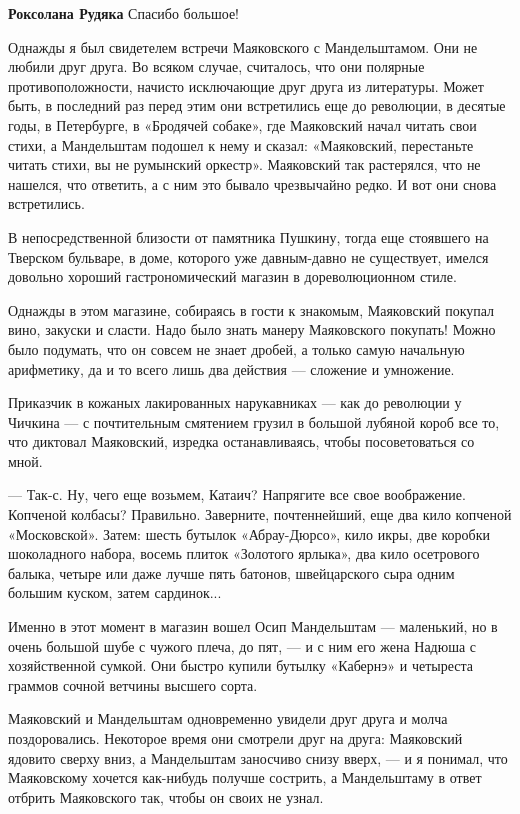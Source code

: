 \begin{itemize}
\textbf{Роксолана Рудяка} Спасибо большое!


Однажды я был свидетелем встречи Маяковского с Мандельштамом. Они не любили
друг друга. Во всяком случае, считалось, что они полярные противоположности,
начисто исключающие друг друга из литературы. Может быть, в последний раз перед
этим они встретились еще до революции, в десятые годы, в Петербурге, в
«Бродячей собаке», где Маяковский начал читать свои стихи, а Мандельштам
подошел к нему и сказал: «Маяковский, перестаньте читать стихи, вы не румынский
оркестр». Маяковский так растерялся, что не нашелся, что ответить, а с ним это
бывало чрезвычайно редко. И вот они снова встретились.

В непосредственной близости от памятника Пушкину, тогда еще стоявшего на
Тверском бульваре, в доме, которого уже давным-давно не существует, имелся
довольно хороший гастрономический магазин в дореволюционном стиле.

Однажды в этом магазине, собираясь в гости к знакомым, Маяковский покупал вино,
закуски и сласти. Надо было знать манеру Маяковского покупать! Можно было
подумать, что он совсем не знает дробей, а только самую начальную арифметику,
да и то всего лишь два действия — сложение и умножение.

Приказчик в кожаных лакированных нарукавниках — как до революции у Чичкина — с
почтительным смятением грузил в большой лубяной короб все то, что диктовал
Маяковский, изредка останавливаясь, чтобы посоветоваться со мной.

— Так-с. Ну, чего еще возьмем, Катаич? Напрягите все свое воображение. Копченой
колбасы? Правильно. Заверните, почтеннейший, еще два кило копченой
«Московской». Затем: шесть бутылок «Абрау-Дюрсо», кило икры, две коробки
шоколадного набора, восемь плиток «Золотого ярлыка», два кило осетрового
балыка, четыре или даже лучше пять батонов, швейцарского сыра одним большим
куском, затем сардинок...

Именно в этот момент в магазин вошел Осип Мандельштам — маленький, но в очень
большой шубе с чужого плеча, до пят, — и с ним его жена Надюша с хозяйственной
сумкой. Они быстро купили бутылку «Кабернэ» и четыреста граммов сочной ветчины
высшего сорта.

Маяковский и Мандельштам одновременно увидели друг друга и молча поздоровались.
Некоторое время они смотрели друг на друга: Маяковский ядовито сверху вниз, а
Мандельштам заносчиво снизу вверх, — и я понимал, что Маяковскому хочется
как-нибудь получше сострить, а Мандельштаму в ответ отбрить Маяковского так,
чтобы он своих не узнал.


\end{itemize}
